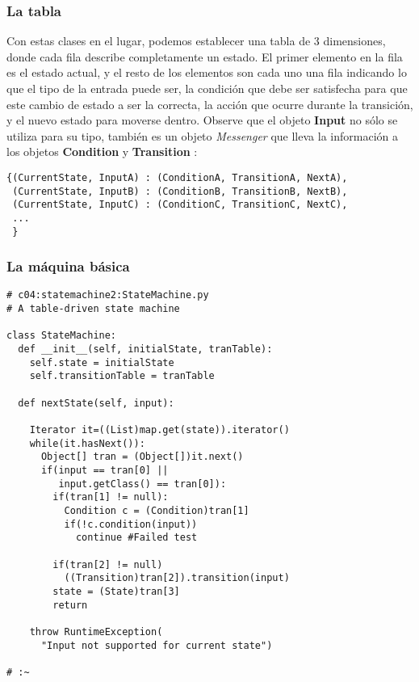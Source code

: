 \subsubsection*{La tabla}
\label{subsubsec:lt}

Con estas clases en el lugar, podemos establecer una tabla de 3 dimensiones, donde cada fila describe completamente un estado. El primer elemento en la fila es el estado actual, y el resto de los elementos son cada uno una fila indicando lo que el tipo de la entrada puede ser, la condición que debe ser satisfecha para que este cambio de estado a ser la correcta, la acción que ocurre durante la transición, y el nuevo estado para moverse dentro. Observe que el objeto \textbf{Input} no sólo se utiliza para su tipo, también es un objeto \textit{Messenger} que lleva la información a los objetos \textbf{Condition} y \textbf{ Transition} :     \newline

\begin{lstlisting}
{(CurrentState, InputA) : (ConditionA, TransitionA, NextA), 
 (CurrentState, InputB) : (ConditionB, TransitionB, NextB), 
 (CurrentState, InputC) : (ConditionC, TransitionC, NextC), 
 ... 
 }
\end{lstlisting}


\subsubsection*{La máquina básica}
\label{subsubsec:lmb}

\begin{lstlisting}
# c04:statemachine2:StateMachine.py 
# A table-driven state machine 

class StateMachine: 
  def __init__(self, initialState, tranTable): 
    self.state = initialState 
    self.transitionTable = tranTable 
    
  def nextState(self, input): 
  
    Iterator it=((List)map.get(state)).iterator() 
    while(it.hasNext()): 
      Object[] tran = (Object[])it.next() 
      if(input == tran[0] ||  
         input.getClass() == tran[0]): 
        if(tran[1] != null): 
          Condition c = (Condition)tran[1] 
          if(!c.condition(input)) 
            continue #Failed test
            
        if(tran[2] != null) 
          ((Transition)tran[2]).transition(input) 
        state = (State)tran[3] 
        return 
        
    throw RuntimeException( 
      "Input not supported for current state") 
      
# :~ 
\end{lstlisting}

